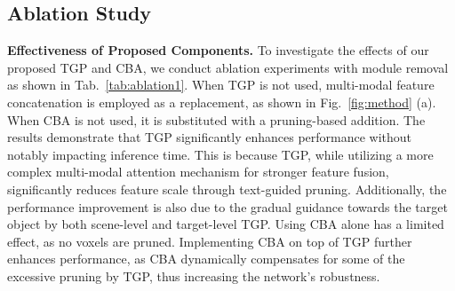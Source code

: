 \subsection{Ablation Study}

\textbf{Effectiveness of Proposed Components.} 
To investigate the effects of our proposed TGP and CBA, we conduct ablation experiments with module removal as shown in Tab.~\ref{tab:ablation1}. When TGP is not used, multi-modal feature concatenation is employed as a replacement, as shown in Fig.~\ref{fig:method} (a). When CBA is not used, it is substituted with a pruning-based addition. The results demonstrate that TGP significantly enhances performance without notably impacting inference time. This is because TGP, while utilizing a more complex multi-modal attention mechanism for stronger feature fusion, significantly reduces feature scale through text-guided pruning. Additionally, the performance improvement is also due to the gradual guidance towards the target object by both scene-level and target-level TGP. Using CBA alone has a limited effect, as no voxels are pruned. Implementing CBA on top of TGP further enhances performance, as CBA dynamically compensates for some of the excessive pruning by TGP, thus increasing the network's robustness.



